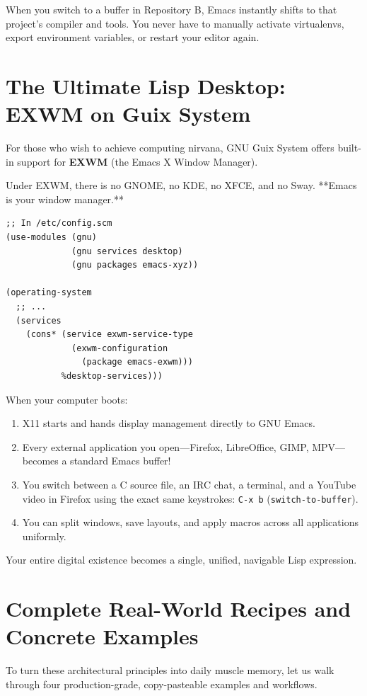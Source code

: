 When you switch to a buffer in Repository B, Emacs instantly shifts to that project's compiler and tools. You never have to manually activate virtualenvs, export environment variables, or restart your editor again.

\section{The Ultimate Lisp Desktop: EXWM on Guix System}

For those who wish to achieve computing nirvana, GNU Guix System offers built-in support for \textbf{EXWM} (the Emacs X Window Manager).

Under EXWM, there is no GNOME, no KDE, no XFCE, and no Sway. **Emacs is your window manager.**

\begin{lstlisting}[style=guixscheme]
;; In /etc/config.scm
(use-modules (gnu)
             (gnu services desktop)
             (gnu packages emacs-xyz))

(operating-system
  ;; ...
  (services
    (cons* (service exwm-service-type
             (exwm-configuration
               (package emacs-exwm)))
           %desktop-services)))
\end{lstlisting}

When your computer boots:
\begin{enumerate}
  \item X11 starts and hands display management directly to GNU Emacs.
  \item Every external application you open---Firefox, LibreOffice, GIMP, MPV---becomes a standard Emacs buffer!
  \item You switch between a C source file, an IRC chat, a terminal, and a YouTube video in Firefox using the exact same keystrokes: \texttt{C-x b} (\texttt{switch-to-buffer}).
  \item You can split windows, save layouts, and apply macros across all applications uniformly.
\end{enumerate}

Your entire digital existence becomes a single, unified, navigable Lisp expression.

\section{Complete Real-World Recipes and Concrete Examples}

To turn these architectural principles into daily muscle memory, let us walk through four production-grade, copy-pasteable examples and workflows.

